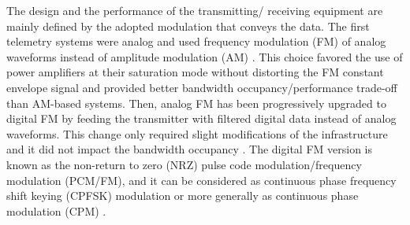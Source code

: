 The design and the performance of the transmitting/ receiving equipment are mainly defined by the adopted modulation that conveys the data. The first telemetry systems were analog and used frequency modulation (FM) of analog waveforms instead of amplitude modulation (AM) \cite{osti_1143131}. This choice favored the use of power amplifiers at their saturation mode without distorting the FM constant envelope signal and provided better bandwidth occupancy/performance trade-off than AM-based systems. Then, analog FM has been progressively upgraded to digital FM by feeding the transmitter with filtered digital data instead of analog waveforms. This change only required slight modifications of the infrastructure and it did not impact the bandwidth occupancy \cite{osti_1143131}. The digital FM version is known as the non-return to zero (NRZ) pulse code modulation/frequency modulation (PCM/FM), and it can be considered as continuous phase frequency shift keying (CPFSK) modulation or more generally as continuous phase modulation (CPM) \cite{digital_phase_mod}.       

